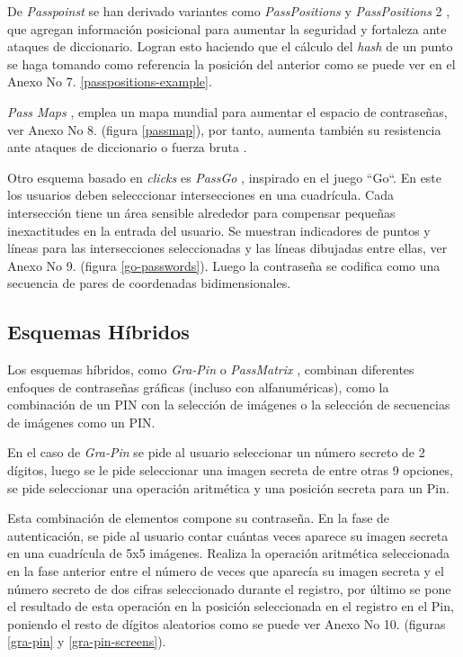 De \textit{Passpoinst} se han derivado variantes como \textit{PassPositions} y \textit{PassPositions} 2 \cite{8320723}, que agregan información posicional para aumentar la seguridad y fortaleza ante ataques de diccionario. Logran esto haciendo que el cálculo del \textit{hash} de un punto se haga tomando como referencia la posición del anterior como se puede ver en el Anexo No 7. \ref{passpositions-example}.




\textit{Pass Maps} \cite{10.1145/2414456.2414513}, emplea un mapa mundial para aumentar el espacio de contraseñas, ver Anexo No 8. (figura \ref{passmap}), por tanto, aumenta también su resistencia ante ataques de diccionario o fuerza bruta \cite{5738831}.



Otro esquema basado en \textit{clicks} es \textit{PassGo} \cite{tao2008pass}, inspirado en el juego ``Go``. En este los usuarios deben selecccionar intersecciones en una cuadrícula. Cada intersección tiene un área sensible alrededor para compensar pequeñas inexactitudes en la entrada del usuario. Se muestran indicadores de puntos y líneas para las intersecciones seleccionadas y las líneas dibujadas entre ellas, ver Anexo No 9. (figura \ref{go-passwords}). Luego la contraseña se codifica como una secuencia de pares de coordenadas bidimensionales.



\subsection{Esquemas Híbridos}
Los esquemas híbridos, como \textit{Gra-Pin} \cite{kausar2022gra} o \textit{PassMatrix} \cite{8250568}, combinan diferentes enfoques de contraseñas gráficas (incluso con alfanuméricas), como la combinación de un PIN con la selección de imágenes o la selección de secuencias de imágenes como un PIN. 

En el caso de \textit{Gra-Pin} \cite{kausar2022gra} se pide al usuario seleccionar un número secreto de 2 dígitos, luego se le pide seleccionar una imagen secreta de entre otras 9 opciones, se pide seleccionar una operación aritmética y una posición secreta para  un Pin. 

Esta combinación de elementos compone su contraseña. En la fase de autenticación, se pide al usuario contar cuántas veces aparece su imagen secreta en una cuadrícula de 5x5 imágenes. Realiza la operación aritmética seleccionada en la fase anterior entre el número de veces que aparecía su imagen secreta y el número secreto de dos cifras seleccionado durante el registro, por último se pone el resultado de esta operación en la posición seleccionada en el registro en el Pin, poniendo el resto de dígitos aleatorios como se puede ver Anexo No 10. (figuras \ref{gra-pin} y \ref{gra-pin-screens}). 

